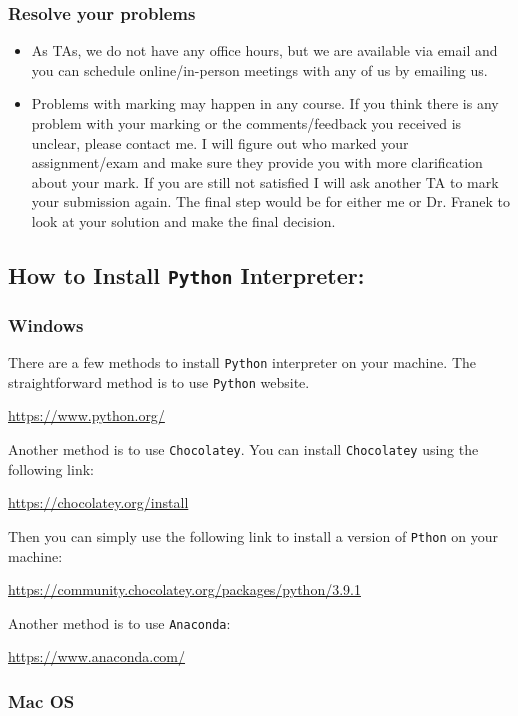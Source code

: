 \documentclass[11pt]{article}
\begin{document}
\subsubsection{Resolve your problems}
\label{sec:orgd5fa0df}

\begin{itemize}
\item As TAs, we do not have any office hours, but we are available via email and you
can schedule online/in-person meetings with any of us by emailing us.

\item Problems with marking may happen in any course. If you think there is any
problem with your marking or the comments/feedback you received is unclear,
please contact me. I will figure out who marked your assignment/exam and make
sure they provide you with more clarification about your mark. If you are
still not satisfied I will ask another TA to mark your submission again. The
final step would be for either me or Dr. Franek to look at your solution and
make the final decision.
\end{itemize}

\subsection{How to Install \texttt{Python} Interpreter:}
\label{sec:orga9c7938}

\subsubsection{Windows}
\label{sec:org70dac2b}

There are a few methods to install \texttt{Python} interpreter on your machine. The
straightforward method is to use \texttt{Python} website.

\url{https://www.python.org/}

Another method is to use \texttt{Chocolatey}. You can install \texttt{Chocolatey} using the
following link:

\url{https://chocolatey.org/install}

Then you can simply use the following link to install a version of \texttt{Pthon} on
your machine:

\url{https://community.chocolatey.org/packages/python/3.9.1}

Another method is to use \texttt{Anaconda}:

\url{https://www.anaconda.com/}


\subsubsection{Mac OS}
\label{sec:org178f8bb}
\end{document}
